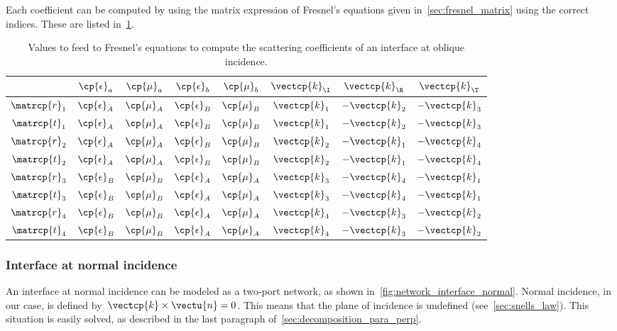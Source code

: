 \begin{refsection}
Each coefficient can be computed by using the matrix expression of Fresnel's equations given in~\cref{sec:fresnel_matrix} using the correct indices.
These are listed in~\cref{tab:fresnel_implementation_indices}.
\begin{table}
    \centering
    \begin{tabular}{cccccccc}
        \toprule
                       & $\cp{\epsilon}_a$ & $\cp{\mu}_a$ & $\cp{\epsilon}_b$ & $\cp{\mu}_b$ & $\vectcp{k}_\I$ & $\vectcp{k}_\R$ & $\vectcp{k}_\T$ \\
        \midrule
        $\matrcp{r}_1$ & $\cp{\epsilon}_A$ & $\cp{\mu}_A$ & $\cp{\epsilon}_B$ & $\cp{\mu}_B$ & $\vectcp{k}_1$  & $-\vectcp{k}_2$ & $-\vectcp{k}_3$ \\
        $\matrcp{t}_1$ & $\cp{\epsilon}_A$ & $\cp{\mu}_A$ & $\cp{\epsilon}_B$ & $\cp{\mu}_B$ & $\vectcp{k}_1$  & $-\vectcp{k}_2$ & $-\vectcp{k}_3$ \\
        $\matrcp{r}_2$ & $\cp{\epsilon}_A$ & $\cp{\mu}_A$ & $\cp{\epsilon}_B$ & $\cp{\mu}_B$ & $\vectcp{k}_2$  & $-\vectcp{k}_1$ & $-\vectcp{k}_4$ \\
        $\matrcp{t}_2$ & $\cp{\epsilon}_A$ & $\cp{\mu}_A$ & $\cp{\epsilon}_B$ & $\cp{\mu}_B$ & $\vectcp{k}_2$  & $-\vectcp{k}_1$ & $-\vectcp{k}_4$ \\
        $\matrcp{r}_3$ & $\cp{\epsilon}_B$ & $\cp{\mu}_B$ & $\cp{\epsilon}_A$ & $\cp{\mu}_A$ & $\vectcp{k}_3$  & $-\vectcp{k}_4$ & $-\vectcp{k}_1$ \\
        $\matrcp{t}_3$ & $\cp{\epsilon}_B$ & $\cp{\mu}_B$ & $\cp{\epsilon}_A$ & $\cp{\mu}_A$ & $\vectcp{k}_3$  & $-\vectcp{k}_4$ & $-\vectcp{k}_1$ \\
        $\matrcp{r}_4$ & $\cp{\epsilon}_B$ & $\cp{\mu}_B$ & $\cp{\epsilon}_A$ & $\cp{\mu}_A$ & $\vectcp{k}_4$  & $-\vectcp{k}_3$ & $-\vectcp{k}_2$ \\
        $\matrcp{t}_4$ & $\cp{\epsilon}_B$ & $\cp{\mu}_B$ & $\cp{\epsilon}_A$ & $\cp{\mu}_A$ & $\vectcp{k}_4$  & $-\vectcp{k}_3$ & $-\vectcp{k}_2$ \\
        \bottomrule
    \end{tabular}
    \caption{
        Values to feed to Fresnel's equations to compute the scattering coefficients
        of an interface at oblique incidence.
    }
    \label{tab:fresnel_implementation_indices}
\end{table}


\subsubsection{Interface at normal incidence}
\label{sec:interface_normal_incidence}
An interface at normal incidence can be modeled as a two-port network,
as shown in~\cref{fig:network_interface_normal}.
Normal incidence, in our case, is defined by~$\vectcp{k} \times \vectu{n} = 0$.
This means that the plane of incidence is undefined (see~\cref{sec:snells_law}).
This situation is easily solved, as described in the last paragraph of~\cref{sec:decomposition_para_perp}.


\end{refsection}
